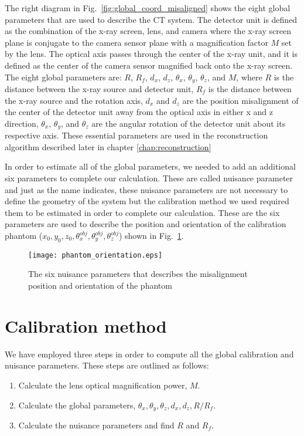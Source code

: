 The right diagram in Fig.~\ref{fig:global_coord_misaligned} shows the eight global parameters that are used to describe the CT system.  The detector unit is defined as the combination of the x-ray screen, lens, and camera where the x-ray screen plane is conjugate to the camera sensor plane with a magnification factor $M$ set by the lens.  The optical axis passes through the center of the x-ray unit, and it is defined as the center of the camera sensor magnified back onto the x-ray screen.  The eight global parameters are: $R$, $R_f$, $d_x$, $d_z$, $\theta_x$, $\theta_y$, $\theta_z$, and $M$, where $R$ is the distance between the x-ray source and detector unit, $R_f$ is the distance between the x-ray source and the rotation axis, $d_x$ and $d_z$ are the position misalignment of the center of the detector unit away from the optical axis in either x and z direction, $\theta_x$, $\theta_y$, and $\theta_z$ are the angular rotation of the detector unit about its respective axis.  These essential parameters are used in the reconstruction algorithm described later in chapter \ref{chap:reconstruction}

In order to estimate all of the global parameters, we needed to add an additional six parameters to complete our calculation.  These are called nuisance parameter and just as the name indicates, these nuisance parameters are not necessary to define the geometry of the system but the calibration method we used required them to be estimated in order to complete our calculation.  These are the six parameters are used to describe the position and orientation of the calibration phantom ($x_0, y_0, z_0, \theta^{obj}_x, \theta_y^{obj}, \theta_z^{obj}$) shown in Fig.~\ref{fig:phantom_orientation}.  

\begin{figure}[ht]
\centering
\texttt{[image: phantom\_orientation.eps]}
\caption{The six nuisance parameters that describes the misalignment position and orientation of the phantom}
\label{fig:phantom_orientation}
\end{figure}

\section{Calibration method}
\label{section:calibration_method}
We have employed three steps in order to compute all the global calibration and nuisance parameters.  These steps are outlined as follows:

\begin{enumerate}
\item Calculate the lens optical magnification power, $M$.
\item Calculate the global parameters, $\theta_x, \theta_y, \theta_z, d_x, d_z, R/R_f$.
\item Calculate the nuisance parameters and find $R$ and $R_f$.
\end{enumerate}

